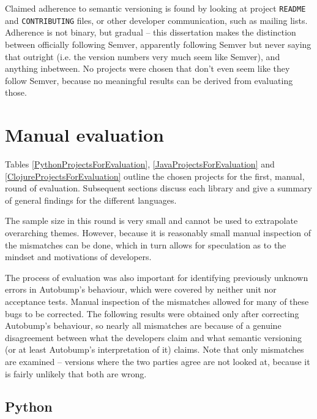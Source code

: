 \documentclass{l4proj}
\newcommand\genericstyle{\lstset{basicstyle=\ttm}}
\newcommand\codeinline[1]{{\genericstyle\lstinline!#1!}}
\begin{document}
Claimed adherence to semantic versioning is found by looking at
project \codeinline{README} and \codeinline{CONTRIBUTING} files, or
other developer communication, such as mailing lists. Adherence is not
binary, but gradual -- this dissertation makes the distinction between
officially following Semver, apparently following Semver but never
saying that outright (i.e. the version numbers very much seem like
Semver), and anything inbetween. No projects were chosen that don't
even seem like they follow Semver, because no meaningful results can
be derived from evaluating those.

\section{Manual evaluation}

Tables \ref{PythonProjectsForEvaluation},
\ref{JavaProjectsForEvaluation} and \ref{ClojureProjectsForEvaluation}
outline the chosen projects for the first, manual, round of
evaluation. Subsequent sections discuss each library and give a
summary of general findings for the different languages.

The sample size in this round is very small and cannot be used to
extrapolate overarching themes. However, because it is reasonably
small manual inspection of the mismatches can be done, which in turn
allows for speculation as to the mindset and motivations of developers.

The process of evaluation was also important for identifying
previously unknown errors in Autobump's behaviour, which were covered
by neither unit nor acceptance tests. Manual inspection of the
mismatches allowed for many of these bugs to be corrected. The
following results were obtained only after correcting Autobump's
behaviour, so nearly all mismatches are because of a genuine
disagreement between what the developers claim and what semantic
versioning (or at least Autobump's interpretation of it) claims. Note
that only mismatches are examined -- versions where the two parties
agree are not looked at, because it is fairly unlikely that both are
wrong.

\subsection{Python}
\end{document}
